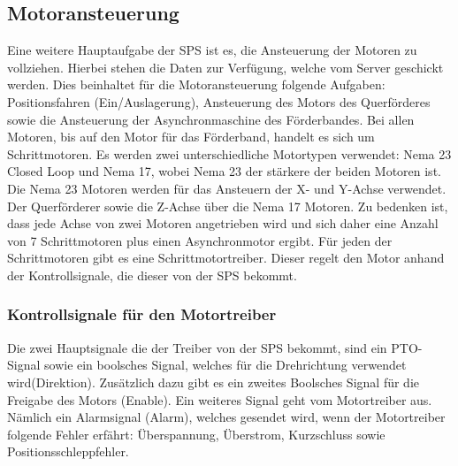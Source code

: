 \subsection{Motoransteuerung}
Eine weitere Hauptaufgabe der SPS ist es, die Ansteuerung der Motoren zu vollziehen. Hierbei stehen die Daten zur Verfügung, welche vom Server geschickt werden. Dies beinhaltet für die Motoransteuerung folgende Aufgaben: Positionsfahren (Ein/Auslagerung), Ansteuerung des Motors des Querförderes sowie die Ansteuerung der Asynchronmaschine des Förderbandes. Bei allen Motoren, bis auf den Motor für das Förderband, handelt es sich um Schrittmotoren. Es werden zwei unterschiedliche Motortypen verwendet: Nema 23 Closed Loop und Nema 17, wobei Nema 23 der stärkere der beiden Motoren ist. Die Nema 23 Motoren werden für das Ansteuern der X- und Y-Achse verwendet. Der Querförderer sowie die Z-Achse über die Nema 17 Motoren. Zu bedenken ist, dass jede Achse von zwei Motoren angetrieben wird und sich daher eine Anzahl von 7 Schrittmotoren plus einen Asynchronmotor ergibt. Für jeden der Schrittmotoren gibt es eine Schrittmotortreiber. Dieser regelt den Motor anhand der Kontrollsignale, die dieser von der SPS bekommt. 

\subsubsection[Kontrollsignale für den Motortreiber]
{Kontrollsignale für den Motortreiber \cite{User-Manual_CL57T}}

Die zwei Hauptsignale die der Treiber von der SPS bekommt, sind ein PTO-Signal sowie ein boolsches Signal, welches für die Drehrichtung verwendet wird(Direktion). Zusätzlich dazu gibt es ein zweites Boolsches Signal für die Freigabe des Motors (Enable). Ein weiteres Signal geht vom Motortreiber aus. Nämlich ein Alarmsignal (Alarm), welches gesendet wird, wenn der Motortreiber folgende Fehler erfährt: Überspannung, Überstrom, Kurzschluss sowie Positionsschleppfehler.

